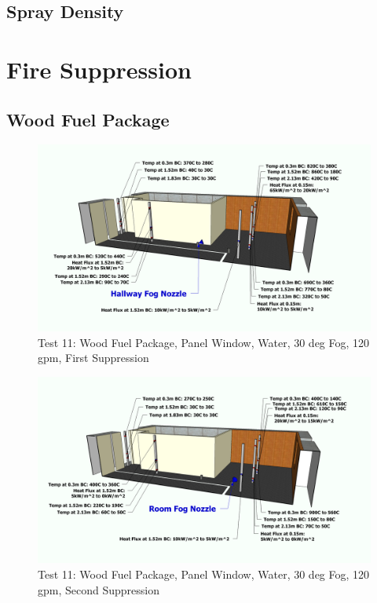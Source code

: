 \documentclass[12pt,oneside]{book}
\begin{document}
\subsection{Spray Density}
\label{subsec:Spray_Density}

\section{Fire Suppression}
\label{sec:Fire_Suppression}	
	
\subsection{Wood Fuel Package}
\label{subsec:Wood_Fuel_Package}

\begin{figure}[!ht]
	\includegraphics[width=6in]{../Figures/Pictures/Metric/DelCoFogTest11FirstSuppression}
	\caption{Test 11: Wood Fuel Package, Panel Window, Water, 30 deg Fog, 120 gpm, First Suppression}
	\label{fig:Test_11_First_Suppression}
\end{figure}

\begin{figure}[!ht]
	\includegraphics[width=6in]{../Figures/Pictures/Metric/DelCoFogTest11SecondSuppression}
	\caption{Test 11: Wood Fuel Package, Panel Window, Water, 30 deg Fog, 120 gpm, Second Suppression}
	\label{fig:Test_11_Second_Suppression}
\end{figure}
\end{document}
